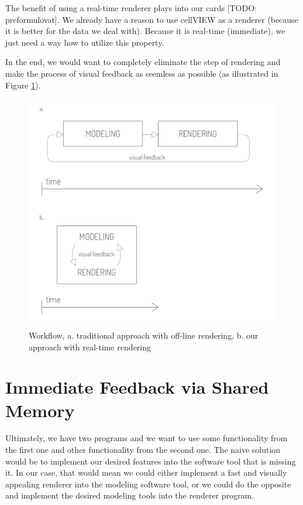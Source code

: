 \documentclass[
  digital, %
  table,   %
  nolof,     %
  nolot,     %
  oneside,
]{fithesis3}
\begin{document}
The benefit of using a real-time renderer plays into our cards [TODO: preformulovat]. We already have a reason to use cellVIEW as a renderer (because it is better for the data we deal with). Because it is real-time (immediate), we just need a way how to utilize this property.

In the end, we would want to completely eliminate the step of rendering and make the process of visual feedback as seemless as possible (as illustrated in Figure \ref{fig:workflow-before-after}).

\begin{figure}
  \centering
  \includegraphics[scale=0.8]{images/workflow-before-after.pdf}
  \caption{Workflow, a. traditional approach with off-line rendering, b. our approach with real-time rendering}
  \label{fig:workflow-before-after}
\end{figure}

\section{Immediate Feedback via Shared Memory}
Ultimately, we have two programs and we want to use some functionality from the first one and other functionality from the second one. The naive solution would be to implement our desired features into the software tool that is missing it. In our case, that would mean we could either implement a fast and visually appealing renderer into the modeling software tool, or we could do the opposite and implement the desired modeling tools into the renderer program.
\end{document}
